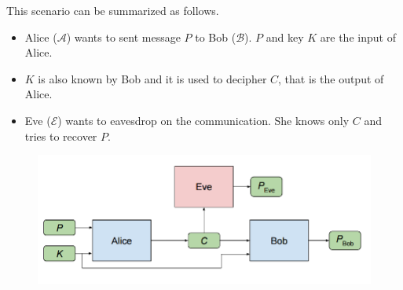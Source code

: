 \documentclass{beamer}
\begin{document}
\begin{frame}
This scenario can be summarized as follows.
\begin{itemize}
\item Alice ($\mathcal{A}$) wants to sent message $P$ to Bob ($\mathcal{B}$). $P$ and key $K$ are the input of Alice. 
\item $K$ is also known by Bob and it is used to decipher $C$, that is the output of Alice.
\item Eve ($\mathcal{E}$) wants to eavesdrop on the communication. She knows only $C$ and tries to recover $P$.

\end{itemize}
\begin{figure}
\includegraphics[width = \textwidth]{"pictures/anc.png"}
\end{figure}
\end{frame}
\end{document}
